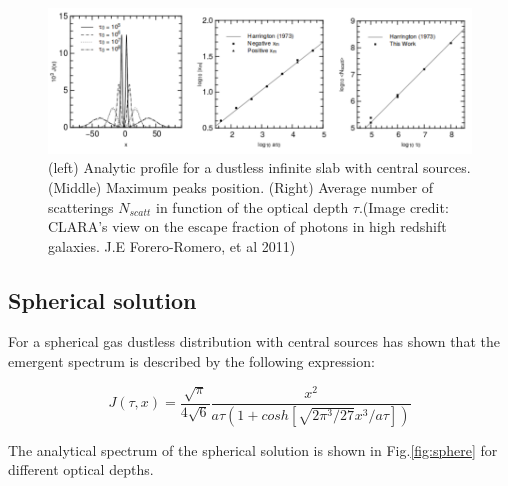 \begin{figure}[H]
\begin{center}
\includegraphics[scale=0.4]{Figures/slab.png}
\end{center}\caption{(left) Analytic profile for a dustless infinite slab with central
\ly sources. (Middle) Maximum peaks position. (Right) Average number of 
scatterings $N_{scatt}$ in function of the optical depth $\tau$.(Image credit:  CLARA's view on the escape fraction of \ly photons in high redshift galaxies. J.E Forero-Romero, et al 2011)\label{fig:slab}}
\end{figure}

\subsection{Spherical solution}

For a spherical gas dustless distribution with central \ly sources \citep{Dijkstra06} has shown that the emergent spectrum is described by the following expression:

\begin{equation}
J(\tau, x) = \dfrac{\sqrt{\pi}}{4\sqrt{6}}\dfrac{x^2}{a\tau (1+cosh[\sqrt{2\pi^3/27}x^3/a\tau])}
\end{equation}

The analytical spectrum of the spherical solution 
is shown in Fig.\ref{fig:sphere} for different optical depths. 

